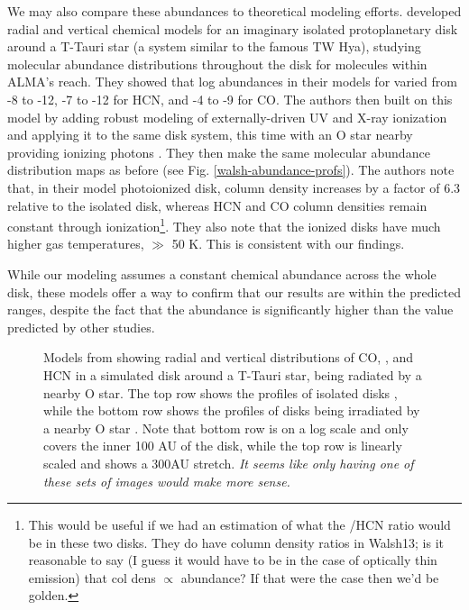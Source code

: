 We may also compare these abundances to theoretical modeling efforts. \citet{Walsh2010} developed radial and vertical chemical models for an imaginary isolated protoplanetary disk around a T-Tauri star (a system similar to the famous TW Hya), studying molecular abundance distributions throughout the disk for molecules within ALMA's reach. They showed that log abundances in their models for \hco varied from -8 to -12, -7 to -12 for HCN, and -4 to -9 for CO. The authors then built on this model by adding robust modeling of externally-driven UV and X-ray ionization \citep{Walsh2012} and applying it to the same disk system, this time with an O star nearby providing ionizing photons \citep{Walsh2013}. They then make the same molecular abundance distribution maps as before (see Fig. \ref{walsh-abundance-profs}). The authors note that, in their model photoionized disk, \hco column density increases by a factor of 6.3 relative to the isolated disk, whereas HCN and CO column densities remain constant through ionization\footnote{This would be useful if we had an estimation of what the \hco/HCN ratio would be in these two disks. They do have column density ratios in Walsh13; is it reasonable to say (I guess it would have to be in the case of optically thin emission) that col dens $\propto$ abundance? If that were the case then we'd be golden.}. They also note that the ionized disks have much higher gas temperatures, $\gg$ 50 K. This is consistent with our findings.


While our modeling assumes a constant chemical abundance across the whole disk, these models offer a way to confirm that our results are within the predicted ranges, despite the fact that the \hco abundance is significantly higher than the value predicted by other studies.



\begin{figure}[t]
  \hspace*{\fill}%
  \vfill%
  \hspace*{\fill}%
  \caption{Models from \citet{Walsh2013} showing radial and vertical distributions of CO, \hco, and HCN in a simulated disk around a T-Tauri star, being radiated by a nearby O star. The top row shows the profiles of isolated disks \citep{Walsh2010}, while the bottom row shows the profiles of disks being irradiated by a nearby O star \citep{Walsh2013}. Note that bottom row is on a log scale and only covers the inner 100 AU of the disk, while the top row is linearly scaled and shows a 300AU stretch. \textit{It seems like only having one of these sets of images would make more sense.}}
  \label{fig:walsh-abundance-profs}
\end{figure}




